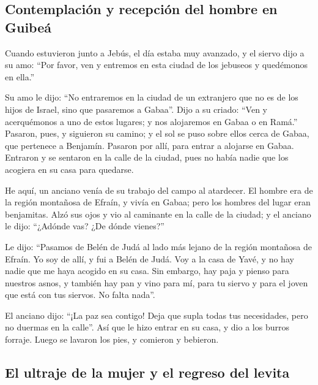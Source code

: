 \hypertarget{contemplaciuxf3n-y-recepciuxf3n-del-hombre-en-guibeuxe1}{%
\subsection{Contemplación y recepción del hombre en
Guibeá}\label{contemplaciuxf3n-y-recepciuxf3n-del-hombre-en-guibeuxe1}}

 Cuando estuvieron junto a Jebús, el día estaba muy
avanzado, y el siervo dijo a su amo: ``Por favor, ven y entremos en esta
ciudad de los jebuseos y quedémonos en ella.''

 Su amo le dijo: ``No entraremos en la ciudad de un
extranjero que no es de los hijos de Israel, sino que pasaremos a
Gabaa''.  Dijo a su criado: ``Ven y acerquémonos a uno de
estos lugares; y nos alojaremos en Gabaa o en Ramá.'' 
Pasaron, pues, y siguieron su camino; y el sol se puso sobre ellos cerca
de Gabaa, que pertenece a Benjamín.  Pasaron por allí,
para entrar a alojarse en Gabaa. Entraron y se sentaron en la calle de
la ciudad, pues no había nadie que los acogiera en su casa para
quedarse.

 He aquí, un anciano venía de su trabajo del campo al
atardecer. El hombre era de la región montañosa de Efraín, y vivía en
Gabaa; pero los hombres del lugar eran benjamitas.  Alzó
sus ojos y vio al caminante en la calle de la ciudad; y el anciano le
dijo: ``¿Adónde vas? ¿De dónde vienes?''

 Le dijo: ``Pasamos de Belén de Judá al lado más lejano
de la región montañosa de Efraín. Yo soy de allí, y fui a Belén de Judá.
Voy a la casa de Yavé, y no hay nadie que me haya acogido en su casa.
 Sin embargo, hay paja y pienso para nuestros asnos, y
también hay pan y vino para mí, para tu siervo y para el joven que está
con tus siervos. No falta nada''.

 El anciano dijo: ``¡La paz sea contigo! Deja que supla
todas tus necesidades, pero no duermas en la calle''. 
Así que le hizo entrar en su casa, y dio a los burros forraje. Luego se
lavaron los pies, y comieron y bebieron.

\hypertarget{el-ultraje-de-la-mujer-y-el-regreso-del-levita}{%
\subsection{El ultraje de la mujer y el regreso del
levita}\label{el-ultraje-de-la-mujer-y-el-regreso-del-levita}}

